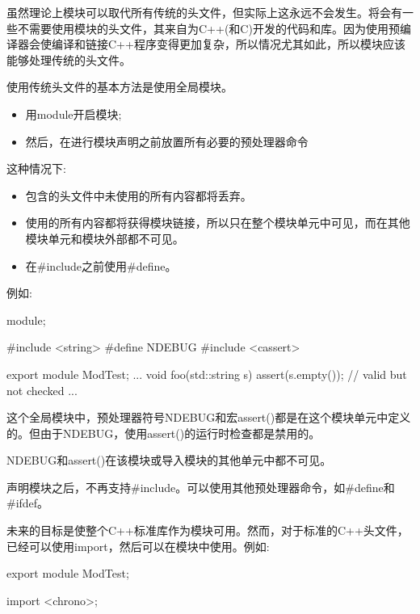 
虽然理论上模块可以取代所有传统的头文件，但实际上这永远不会发生。将会有一些不需要使用模块的头文件，其来自为C++(和C)开发的代码和库。因为使用预编译器会使编译和链接C++程序变得更加复杂，所以情况尤其如此，所以模块应该能够处理传统的头文件。

使用传统头文件的基本方法是使用全局模块。

\begin{itemize}
\item
用module开启模块;

\item
然后，在进行模块声明之前放置所有必要的预处理器命令
\end{itemize}

这种情况下:

\begin{itemize}
\item
包含的头文件中未使用的所有内容都将丢弃。

\item
使用的所有内容都将获得模块链接，所以只在整个模块单元中可见，而在其他模块单元和模块外部都不可见。

\item
在\#include之前使用\#define。
\end{itemize}

例如:

\begin{cpp}
module;

#include <string>
#define NDEBUG
#include <cassert>

export module ModTest;
...
void foo(std::string s) {
	assert(s.empty()); // valid but not checked
	...
}
\end{cpp}

这个全局模块中，预处理器符号NDEBUG和宏assert()都是在这个模块单元中定义的。但由于NDEBUG，使用assert()的运行时检查都是禁用的。

NDEBUG和assert()在该模块或导入模块的其他单元中都不可见。

声明模块之后，不再支持\#include。可以使用其他预处理器命令，如\#define和\#ifdef。


未来的目标是使整个C++标准库作为模块可用。然而，对于标准的C++头文件，已经可以使用import，然后可以在模块中使用。例如:

\begin{cpp}
export module ModTest;

import <chrono>;
\end{cpp}

